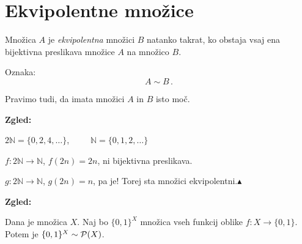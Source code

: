 \documentclass[11pt,paper=b5,footinclude,headinclude]{scrbook} %
\def\zgled{\noindent\textbf{\color{blue} Zgled: }}
\def\kz{{\hfill{\color{blue}$\blacktriangle$}}}%
\begin{document}
\section{Ekvipolentne množice}

Množica $A$ je {\em ekvipolentna} množici $B$ natanko takrat, ko obstaja vsaj ena bijektivna preslikava
množice $A$ na množico $B$.

Oznaka: $$A\sim B\,.$$

Pravimo tudi, da imata množici $A$ in $B$ isto moč.

\bigskip

\zgled

$2\mathbb{N} = \{0,2,4,\ldots\}$,~~~~~$\mathbb{N} = \{0,1,2,\ldots\}$

$f: 2\mathbb{N} \to \mathbb{N}$, $f(2n) = 2n$, ni bijektivna preslikava.

$g: 2\mathbb{N} \to \mathbb{N}$, $g(2n) = n$, pa je! Torej sta množici ekvipolentni.\kz

\bigskip

\zgled

Dana je množica $X$. Naj bo $\{0,1\}^X$ množica vseh funkcij oblike $f: X\to \{0,1\}$.
Potem je $\{0,1\}^X\sim {\cal P}(X)$.
\end{document}
